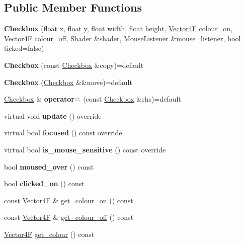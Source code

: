\subsection*{Public Member Functions}
\begin{DoxyCompactItemize}
\item 
\mbox{\label{class_checkbox_aef583c2ed2cc9004aec3330f9b9d02a3}} 
{\bfseries Checkbox} (float x, float y, float width, float height, \mbox{\hyperlink{class_vector4}{Vector4F}} colour\+\_\+on, \mbox{\hyperlink{class_vector4}{Vector4F}} colour\+\_\+off, \mbox{\hyperlink{class_shader}{Shader}} \&shader, \mbox{\hyperlink{class_mouse_listener}{Mouse\+Listener}} \&mouse\+\_\+listener, bool ticked=false)
\item 
\mbox{\label{class_checkbox_aeb1ef0bb330434f54a24ceb526b3d5cb}} 
{\bfseries Checkbox} (const \mbox{\hyperlink{class_checkbox}{Checkbox}} \&copy)=default
\item 
\mbox{\label{class_checkbox_aed2e4a8517f294ac7c4b0e7e6724a276}} 
{\bfseries Checkbox} (\mbox{\hyperlink{class_checkbox}{Checkbox}} \&\&move)=default
\item 
\mbox{\label{class_checkbox_af3942086e15ceff6bf5ac59bef5fa4b7}} 
\mbox{\hyperlink{class_checkbox}{Checkbox}} \& {\bfseries operator=} (const \mbox{\hyperlink{class_checkbox}{Checkbox}} \&rhs)=default
\item 
\mbox{\label{class_checkbox_a69c9fb9ce334fc8ff76c49447f1e002d}} 
virtual void {\bfseries update} () override
\item 
\mbox{\label{class_checkbox_a2a2c82a9e8c95ad868ce85a60ba07292}} 
virtual bool {\bfseries focused} () const override
\item 
\mbox{\label{class_checkbox_a63fc27bae94d81d4dee8cd2d0e474d2b}} 
virtual bool {\bfseries is\+\_\+mouse\+\_\+sensitive} () const override
\item 
\mbox{\label{class_checkbox_a6780c6fb30c8b7cec8b55943ec31f1f4}} 
bool {\bfseries moused\+\_\+over} () const
\item 
\mbox{\label{class_checkbox_a67e81d283ae9ead851c902572096bd99}} 
bool {\bfseries clicked\+\_\+on} () const
\item 
const \mbox{\hyperlink{class_vector4}{Vector4F}} \& \mbox{\hyperlink{class_checkbox_accb44cc4cde3fe6ad7a88b27831fa37a}{get\+\_\+colour\+\_\+on}} () const
\item 
const \mbox{\hyperlink{class_vector4}{Vector4F}} \& \mbox{\hyperlink{class_checkbox_ac99d837db8754756bcaa417e96162844}{get\+\_\+colour\+\_\+off}} () const
\item 
\mbox{\hyperlink{class_vector4}{Vector4F}} \mbox{\hyperlink{class_checkbox_ada05d14b0502bc3534c83478b7bad8fb}{get\+\_\+colour}} () const
\end{DoxyCompactItemize}
